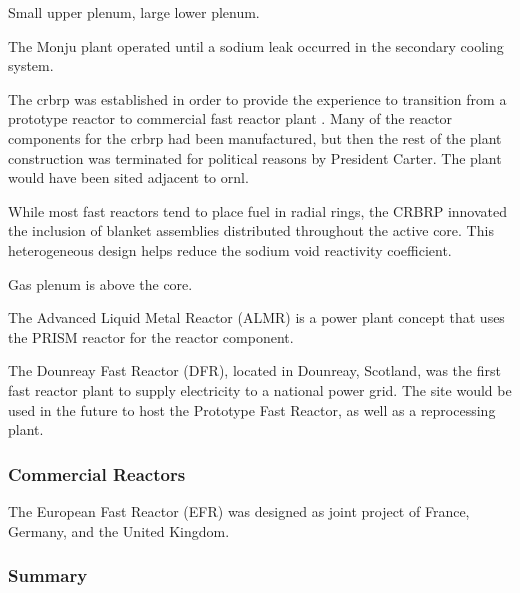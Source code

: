 \documentclass[10pt]{article}
\newcounter{subsubsubsection}[subsubsection]
\numberwithin{equation}{section} %
\begin{document}
Small upper plenum, large lower plenum.

The Monju plant operated until a sodium leak occurred in the secondary cooling system. 


The \gls{crbrp} was established in order to provide the experience to transition from a prototype reactor to commercial fast reactor plant \cite{CRBRP}. Many of the reactor components for the \gls{crbrp} had been manufactured, but then the rest of the plant construction was terminated for political reasons by President Carter. The plant would have been sited adjacent to \gls{ornl}. 

While most fast reactors tend to place fuel in radial rings, the CRBRP innovated the inclusion of blanket assemblies distributed throughout the active core. This heterogeneous design helps reduce the sodium void reactivity coefficient. 

Gas plenum is above the core. 

The Advanced Liquid Metal Reactor (ALMR) is a power plant concept that uses the PRISM reactor for the reactor component. 






The Dounreay Fast Reactor (DFR), located in Dounreay, Scotland, was the first fast reactor plant to supply electricity to a national power grid. The site would be used in the future to host the Prototype Fast Reactor, as well as a reprocessing plant. 












\subsubsection{Commercial Reactors}

The European Fast Reactor (EFR) was designed as joint project of France, Germany, and the United Kingdom. 


\subsubsection{Summary}
\end{document}
